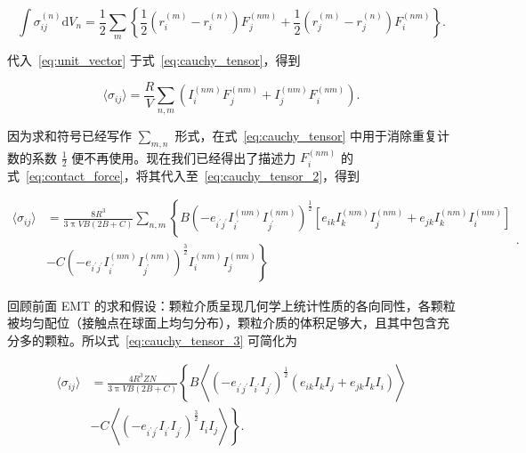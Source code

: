 \begin{equation}
  \int\sigma_{ij}^{(n)}\mathrm{d}V_{n} = \frac{1}{2}\sum_{m}\left\{\frac{1}{2}\left(r_{i}^{(m)} - r_{i}^{(n)}\right)F_{j}^{(nm)} + \frac{1}{2}\left(r_{j}^{(m)} - r_{j}^{(n)}\right)F_{i}^{(nm)}\right\}\label{eq:cauchy_tensor}.
\end{equation}

代入~\eqref{eq:unit_vector} 于式~\eqref{eq:cauchy_tensor}，得到

\begin{equation}
  \langle\sigma_{ij}\rangle = \frac{R}{V}\sum_{n,m}\left(I_{i}^{(nm)}F_{j}^{(nm)} + I_{j}^{(nm)}F_{i}^{(nm)}\right)\label{eq:cauchy_tensor_2}.
\end{equation}

因为求和符号已经写作 $\sum_{m,n}$ 形式，在式~\eqref{eq:cauchy_tensor} 中用于消除重复计数的系数 $\frac{1}{2}$ 便不再使用。现在我们已经得出了描述力 $F_{i}^{(nm)}$ 的式~\eqref{eq:contact_force}，将其代入至~\eqref{eq:cauchy_tensor_2}，得到

\begin{equation}
  \begin{aligned}
    \langle\sigma_{ij}\rangle &= \frac{8R^{3}}{3\uppi VB(2B+C)}\sum_{n,m}\left\{B\left(-e_{i^{\prime}j^{\prime}}I_{i^{\prime}}^{(nm)}I_{j^{\prime}}^{(nm)}\right)^{\frac{1}{2}}\left[e_{ik}I_{k}^{(nm)}I_{j}^{(nm)} + e_{jk}I_{k}^{(nm)}I_{i}^{(nm)}\right]\right.\\
    &-\left. C\left(-e_{i^{\prime}j^{\prime}}I_{i^{\prime}}^{(nm)}I_{j^{\prime}}^{(nm)}\right)^{\frac{3}{2}}I_{i}^{(nm)}I_{j}^{(nm)}\right\}
  \end{aligned}\label{eq:cauchy_tensor_3}.
\end{equation}

回顾前面 EMT 的求和假设：颗粒介质呈现几何学上统计性质的各向同性，各颗粒被均匀配位（接触点在球面上均匀分布），颗粒介质的体积足够大，且其中包含充分多的颗粒。所以式~\eqref{eq:cauchy_tensor_3} 可简化为

\begin{equation}
  \begin{aligned}
  \langle\sigma_{ij}\rangle &= \frac{4R^{3}ZN}{3\uppi VB(2B+C)}\left\{B\left\langle(-e_{i^{\prime}j^{\prime}}I_{i^{\prime}}I_{j^{\prime}})^{\frac{1}{2}}(e_{ik}I_{k}I_{j} + e_{jk}I_{k}I_{i})\right\rangle\right.\\
  &-\left.C\left\langle(-e_{i^{\prime}j^{\prime}}I_{i^{\prime}}I_{j^{\prime}})^{\frac{3}{2}}I_{i}I_{j}\right\rangle\right\}.
  \end{aligned}\label{eq:cauchy_tensor_4}
\end{equation}

